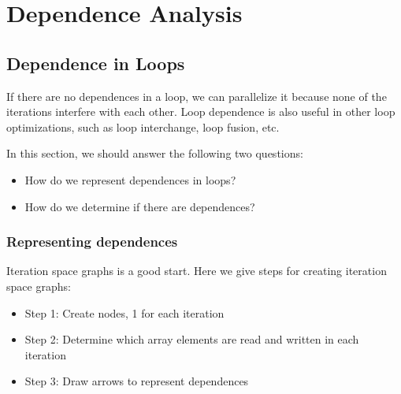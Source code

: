 \newpage

\section{Dependence Analysis}



\subsection{Dependence in Loops}

If there are no dependences in a loop, we can parallelize it because none of the 
iterations interfere with each other. Loop dependence is also useful in other loop optimizations, such
as loop interchange, loop fusion, etc.

In this section, we should answer the following two questions:

\begin{itemize}
\item How do we represent dependences in loops?
\item How do we determine if there are dependences?
\end{itemize}    


\subsubsection{Representing dependences}

Iteration space graphs is a good start. Here we give steps for creating 
iteration space graphs:

\begin{itemize}
    \item Step 1: Create nodes, 1 for each iteration
    \item Step 2: Determine which array elements are read and
    written in each iteration
    \item Step 3: Draw arrows to represent dependences
\end{itemize}    
    

